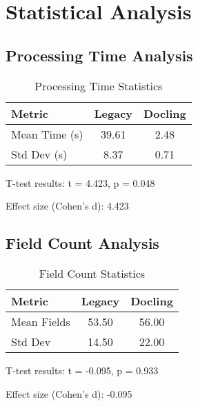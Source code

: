 \section{Statistical Analysis}

\subsection{Processing Time Analysis}

\begin{table}[h]
\centering
\begin{tabular}{l|cc}
\hline
Metric & Legacy & Docling \\
\hline
Mean Time (s) & 39.61 & 2.48 \\
Std Dev (s) & 8.37 & 0.71 \\
\hline
\end{tabular}
\caption{Processing Time Statistics}
\end{table}

T-test results: t = 4.423, p = 0.048

Effect size (Cohen's d): 4.423

\subsection{Field Count Analysis}

\begin{table}[h]
\centering
\begin{tabular}{l|cc}
\hline
Metric & Legacy & Docling \\
\hline
Mean Fields & 53.50 & 56.00 \\
Std Dev & 14.50 & 22.00 \\
\hline
\end{tabular}
\caption{Field Count Statistics}
\end{table}

T-test results: t = -0.095, p = 0.933

Effect size (Cohen's d): -0.095

